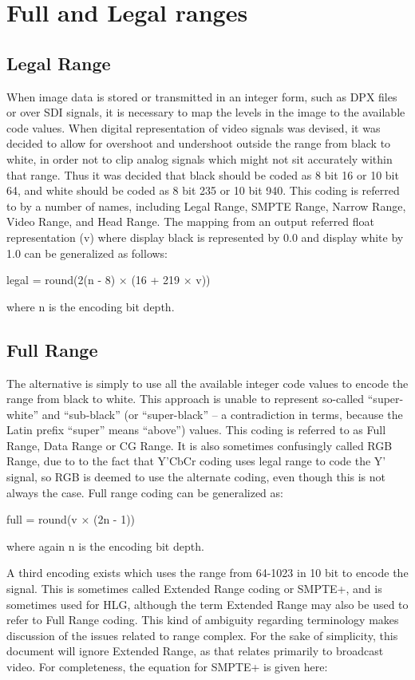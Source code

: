 \section{Full and Legal ranges}

\subsection{Legal Range}

When image data is stored or transmitted in an integer form, such as DPX files or over SDI signals, it is necessary to map the levels in the image to the available code values. When digital representation of video signals was devised, it was decided to allow for overshoot and undershoot outside the range from black to white, in order not to clip analog signals which might not sit accurately within that range. Thus it was decided that black should be coded as 8 bit 16 or 10 bit 64, and white should be coded as 8 bit 235 or 10 bit 940. This coding is referred to by a number of names, including Legal Range, SMPTE Range, Narrow Range, Video Range, and Head Range. The mapping from an output referred float representation (v) where display black is represented by 0.0 and display white by 1.0 can be generalized as follows:

	legal = round(2(n - 8) × (16 + 219 × v))

where n is the encoding bit depth.

\subsection{Full Range}

The alternative is simply to use all the available integer code values to encode the range from black to white. This approach is unable to represent so-called “super-white” and “sub-black” (or “super-black” – a contradiction in terms, because the Latin prefix “super” means “above”) values. This coding is referred to as Full Range, Data Range or CG Range. It is also sometimes confusingly called RGB Range, due to to the fact that Y'CbCr coding uses legal range to code the Y' signal, so RGB is deemed to use the alternate coding, even though this is not always the case. Full range coding can be generalized as:

	full = round(v × (2n - 1))

where again n is the encoding bit depth.

A third encoding exists which uses the range from 64-1023 in 10 bit to encode the signal. This is sometimes called Extended Range coding or SMPTE+, and is sometimes used for HLG, although the term Extended Range may also be used to refer to Full Range coding. This kind of ambiguity regarding terminology makes discussion of the issues related to range complex. For the sake of simplicity, this document will ignore Extended Range, as that relates primarily to broadcast video. For completeness, the equation for SMPTE+ is given here:

